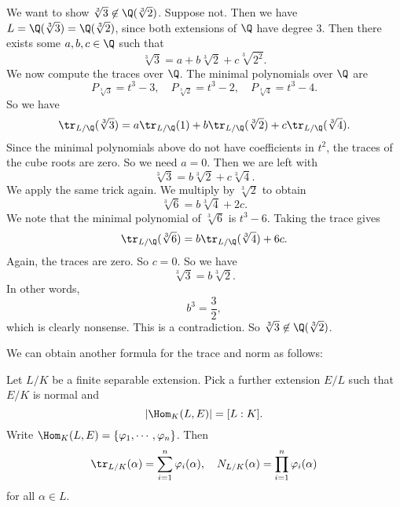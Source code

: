 \documentclass[a4paper]{article}
\begin{document}
\begin{eg}
  We want to show $\sqrt[3]{3} \not\in \Q(\sqrt[3]{2})$. Suppose not. Then we have $L = \Q(\sqrt[3]{3}) = \Q(\sqrt[3]{2})$, since both extensions of $\Q$ have degree $3$. Then there exists some $a, b, c \in \Q$ such that
  \[
    \sqrt[3]{3} = a + b\sqrt[3]{2} + c \sqrt[3]{2^2}.
  \]
  We now compute the traces over $\Q$. The minimal polynomials over $\Q$ are
  \[
    P_{\sqrt[3]{3}} = t^3 - 3,\quad P_{\sqrt[3]{2}} = t^3 - 2,\quad P_{\sqrt[3]{4}} = t^3 - 4.
  \]
  So we have
  \[
    \tr_{L/\Q}(\sqrt[3]{3}) = a \tr_{L/\Q}(1) + b \tr_{L/\Q}(\sqrt[3]{2}) + c\tr_{L/\Q}(\sqrt[3]{4}).
  \]
  Since the minimal polynomials above do not have coefficients in $t^2$, the traces of the cube roots are zero. So we need $a = 0$. Then we are left with
  \[
    \sqrt[3]{3} = b\sqrt[3]{2} + c\sqrt[3]{4}.
  \]
  We apply the same trick again. We multiply by $\sqrt[3]{2}$ to obtain
  \[
    \sqrt[3]{6} = b\sqrt[3]{4} + 2c.
  \]
  We note that the minimal polynomial of $\sqrt[3]{6}$ is $t^3 - 6$. Taking the trace gives
  \[
    \tr_{L/\Q}(\sqrt[3]{6}) = b \tr_{L/\Q}(\sqrt[3]{4}) + 6c.
  \]
  Again, the traces are zero. So $c = 0$. So we have
  \[
    \sqrt[3]{3} = b \sqrt[3]{2}.
  \]
  In other words,
  \[
    b^3 = \frac{3}{2},
  \]
  which is clearly nonsense. This is a contradiction. So $\sqrt[3]{3} \not\in \Q(\sqrt[3]{2})$.
\end{eg}

We can obtain another formula for the trace and norm as follows:
\begin{thm}
  Let $L/K$ be a finite separable extension. Pick a further extension $E/L$ such that $E/K$ is normal and
  \[
    |\Hom_K(L, E)| = [L:K].
  \]
  Write $\Hom_K(L, E) = \{\varphi_1, \cdots, \varphi_n\}$. Then
  \[
    \tr_{L/K} (\alpha) = \sum_{i = 1}^n \varphi_i(\alpha),\quad N_{L/K}(\alpha) = \prod_{i = 1}^n \varphi_i(\alpha)
  \]
  for all $\alpha \in L$.
\end{thm}
\end{document}
